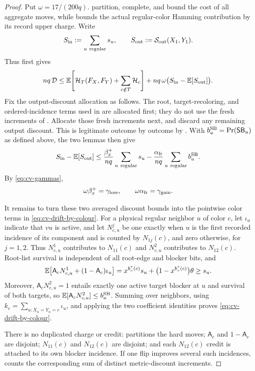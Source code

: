 \begin{proof}
Put $\omega=17/(200q)$.
partition, complete, and bound the cost of all
aggregate moves, while  bounds the actual
regular-color Hamming contribution by its record upper charge.
Write
\[
  S_{\rm in}:=\sum_{u\ {\rm regular}}s_u,
  \qquad
  S_{\rm out}:=\mathcal S_{\rm out}(X_1,Y_1).
\]
Thus
 first gives
\begin{equation}\label{eq:cv-drift-decomp}
 nq\,\mathcal D
 \le \operatorname{\mathbb{E}}\!\left[\mathcal H_T(F_X,F_Y)+
                  \sum_{c\notin T}\mathcal H_c\right]
   +nq\,\omega\bigl(S_{\rm in}-\operatorname{\mathbb{E}}[S_{\rm out}]\bigr).
\end{equation}
Fix the output-discount allocation as
follows. The root, target-recoloring, and
ordered-incidence terms used in  are allocated
first; they do not use the fresh increments of
.  Allocate those fresh increments next, and discard any
remaining output discount.  This is legitimate outcome by outcome by
. With
\(b_u^{\rm SB}=\Pr(\mathsf{SB}_u)\) as defined above, the two lemmas then give
\[
 S_{\rm in}-\operatorname{\mathbb{E}}[S_{\rm out}]
 \le \frac{\beta_x^+}{nq}\sum_{u\ {\rm regular}}s_u
    -\frac{\alpha_{\mathrm{fr}}}{nq}\sum_{u\ {\rm regular}}b_u^{\rm SB} .
\]
By \eqref{eq:cv-gammas},
\[
 \omega\beta_x^+=\gamma_{\rm loss},\qquad
 \omega\alpha_{\mathrm{fr}}=\gamma_{\rm gain}.
\]

It remains to turn these two averaged discount bounds into the
pointwise color terms in \eqref{eq:cv-drift-by-colour}. For a physical regular neighbor
$u$ of color $c$, let $\iota_u$ indicate that $vu$ is active, and let
\(N^j_{c,u}\) be one exactly when \(u\) is the first recorded incidence
of its component and is counted by \(N_{1j}(c)\), and zero otherwise,
for \(j=1,2\).  Thus \(N^1_{c,u}\) contributes to \(N_{11}(c)\) and
\(N^2_{c,u}\) contributes to \(N_{12}(c)\). Root-list
survival is independent of all root-edge and blocker bits, and
\[
 \operatorname{\mathbb{E}}\!\left[\mathsf A_c N^1_{c,u}
            +(1-\mathsf A_c)\iota_u\right]
 =x^{b_v^\tau(c)}s_u+
   \bigl(1-x^{b_v^\tau(c)}\bigr)\theta
 \ge s_u .
\]
Moreover, $\mathsf A_c N^2_{c,u}=1$ entails exactly one active target
blocker at $u$ and survival of both targets, so
  $\operatorname{\mathbb{E}}[\mathsf A_c N^2_{c,u}]\le b_u^{\rm SB}$. Summing over neighbors, using
\(k_c=\sum_{u:X_u=Y_u=c}\iota_u\), and applying the two coefficient identities proves
\eqref{eq:cv-drift-by-colour}.

There is no duplicated charge or credit:
 partitions the hard moves;
$\mathsf A_c$ and $1-\mathsf A_c$ are disjoint;
$N_{11}(c)$ and $N_{12}(c)$ are disjoint; and each $N_{12}(c)$ credit is
attached to its own blocker incidence. If one flip improves
several such incidences,  counts the corresponding sum
of distinct metric-discount increments.
\end{proof}

